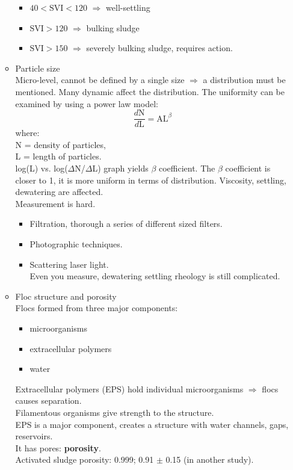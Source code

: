 \documentclass{article}
\numberwithin{equation}{section}
\begin{document}
\begin{enumerate}
\begin{itemize}
\begin{itemize}
    \item $40 < \text{SVI} < 120$ $\Rightarrow$ well-settling
    \item $\text{SVI} > 120$ $\Rightarrow$ bulking sludge
    \item $\text{SVI} > 150$ $\Rightarrow$ severely bulking sludge, requires action.
\end{itemize}
        \item Particle size\\
        Micro-level, cannot be defined by a single size $\Rightarrow$ a distribution must be mentioned.
        Many dynamic affect the distribution. The uniformity can be examined by using a power law model:
        \[
        \frac{d\text{N}}{d\text{L}} = \text{AL}^\beta
        \]
        where:\\
        N = density of particles,\\
        L = length of particles.\\
        log(L) vs. log($\Delta$N/$\Delta$L) graph yields $\beta$ coefficient. The $\beta$ coefficient is closer to 1, it is more uniform in terms of distribution. Viscosity, settling, dewatering are affected.\\
        Measurement is hard.
        \begin{itemize}
            \item Filtration, thorough a series of different sized filters.
            \item Photographic techniques.
            \item Scattering laser light.\\
            Even you measure, dewatering settling rheology is still complicated.
        \end{itemize}
        \item Floc structure and porosity\\
        Flocs formed from three major components:
        \begin{itemize}
            \item microorganisms
            \item extracellular polymers
            \item water
        \end{itemize}
        Extracellular polymers (EPS) hold individual microorganisms $\Rightarrow$ flocs causes separation.\\
        Filamentous organisms give strength to the structure.\\
        EPS is a major component, creates a structure with water channels, gaps, reservoirs.\\
        It has pores: \textbf{porosity}.\\
        Activated sludge porosity: 0.999; 0.91 $\pm$ 0.15 (in another study).
        \end{itemize}
    \end{enumerate}
\end{document}
